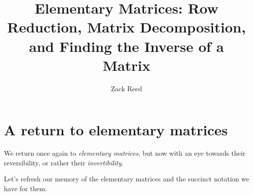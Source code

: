 \documentclass{ximera}
\author{Zack Reed}
\title{Elementary Matrices: Row Reduction, Matrix Decomposition, and Finding the Inverse of a Matrix}
\begin{document}
\begin{abstract}



\end{abstract}
\maketitle

 
\section*{A return to elementary matrices}

We return once again to \emph{elementary matrices}, but now with an eye towards their reversibility, or rather their \emph{invertibility}.

Let's refresh our memory of the elementary matrices and the succinct notation we have for them.
\end{document}
